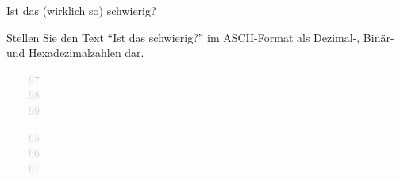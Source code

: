 \begin{frame}{Ist das (wirklich so) schwierig?}
    \begin{exercise}
        Stellen Sie den Text \enquote{Ist das schwierig?} im ASCII-Format als Dezimal-, Binär- und Hexadezimalzahlen dar.
    \end{exercise}
    \pause
    \begin{solve}
        \begin{minipage}{0.5\linewidth}\raggedright
            \pause~~~\textcolor{lightgray}{\footnotesize\faAngleLeft~$97$}\pause\\
            ~~~\textcolor{lightgray}{\footnotesize\faAngleLeft~$98$}\pause\\
            ~~~\textcolor{lightgray}{\footnotesize\faAngleLeft~$99$}
        \end{minipage}\pause\begin{minipage}{0.5\linewidth}\raggedright
            \pause~~~\textcolor{lightgray}{\footnotesize\faAngleLeft~$65$}\pause\\
            ~~~\textcolor{lightgray}{\footnotesize\faAngleLeft~$66$}\pause\\
            ~~~\textcolor{lightgray}{\footnotesize\faAngleLeft~$67$}
        \end{minipage}
    \end{solve}
\end{frame}
\addtocounter{exercise}{-1}\addtocounter{solve}{-1}%

